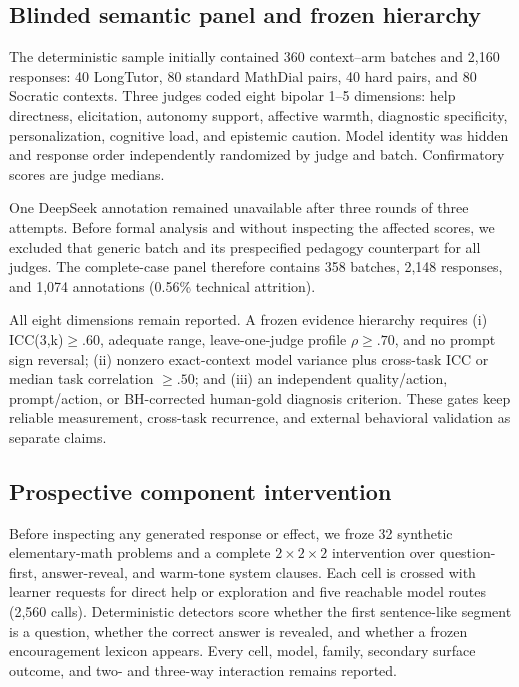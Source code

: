 \documentclass[11pt]{article}
\begin{document}
\subsection{Blinded semantic panel and frozen hierarchy}

The deterministic sample initially contained 360 context--arm batches and 2,160
responses: 40 LongTutor, 80 standard MathDial pairs, 40 hard pairs, and 80
Socratic contexts. Three judges coded eight bipolar 1--5 dimensions: help
directness, elicitation, autonomy support, affective warmth, diagnostic
specificity, personalization, cognitive load, and epistemic caution. Model
identity was hidden and response order independently randomized by judge and
batch. Confirmatory scores are judge medians.

One DeepSeek annotation remained unavailable after three rounds of three
attempts. Before formal analysis and without inspecting the affected scores, we
excluded that generic batch and its prespecified pedagogy counterpart for all
judges. The complete-case panel therefore contains 358 batches, 2,148 responses,
and 1,074 annotations (0.56\% technical attrition).

All eight dimensions remain reported. A frozen evidence hierarchy requires
(i) ICC(3,k)$\geq .60$, adequate range, leave-one-judge profile
$\rho\geq .70$, and no prompt sign reversal; (ii) nonzero exact-context model
variance plus cross-task ICC or median task correlation $\geq .50$; and (iii) an
independent quality/action, prompt/action, or BH-corrected human-gold diagnosis
criterion. These gates keep reliable measurement, cross-task recurrence, and
external behavioral validation as separate claims.

\subsection{Prospective component intervention}

Before inspecting any generated response or effect, we froze 32 synthetic
elementary-math problems and a complete $2\times2\times2$ intervention over
question-first, answer-reveal, and warm-tone system clauses. Each cell is crossed
with learner requests for direct help or exploration and five reachable model
routes (2,560 calls). Deterministic detectors score whether the first
sentence-like segment is a question, whether the correct answer is revealed, and
whether a frozen encouragement lexicon appears. Every cell, model, family,
secondary surface outcome, and
two- and three-way interaction remains reported.
\end{document}
